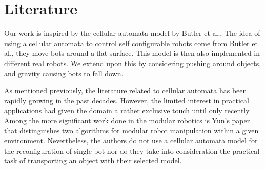 \section{Literature}
\label{sec:lit}

Our work is inspired by the cellular automata model by Butler et al.\cite{butler02}.
The idea of using a cellular automata to control self configurable robots
come from Butler et al., they move bots around a flat surface. This model is
then also implemented in different real robots. We extend upon this by
considering pushing around objects, and gravity causing bots to fall down.

As mentioned previously, the literature related to cellular automata has been rapidly growing in the past decades. However, the limited interest in practical applications had given the domain a rather exclusive touch until only recently. Among the more significant work done in the modular robotics is Yun's paper \cite{Yun:2011:OSA:2036628.2036638} that distinguishes two algorithms for modular robot manipulation within a given environment. Nevertheless, the authors do not use a cellular automata model for the reconfiguration of single bot nor do they take into consideration the practical task of transporting an object with their selected model.

